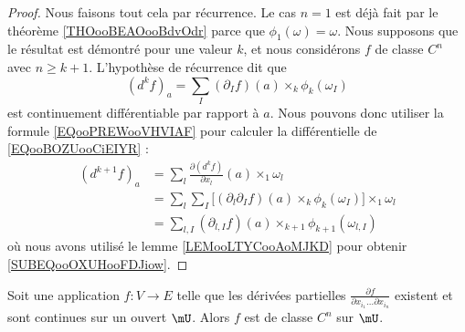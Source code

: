 \begin{proof}
	Nous faisons tout cela par récurrence. Le cas \( n=1\) est déjà fait par le théorème \ref{THOooBEAOooBdvOdr} parce que \( \phi_1(\omega)=\omega\). Nous supposons que le résultat est démontré pour une valeur \( k\), et nous considérons \( f\) de classe \( C^n\) avec \( n\geq k+1\). L'hypothèse de récurrence dit que
	\begin{equation}        \label{EQooBOZUooCiEIYR}
		(d^kf)_a=\sum_{I}(\partial_{I}f)(a)\times_k\phi_k(\omega_{I})
	\end{equation}
	est continuement différentiable par rapport à \( a\). Nous pouvons donc utiliser la formule \eqref{EQooPREWooVHVIAF} pour calculer la différentielle de \eqref{EQooBOZUooCiEIYR} :
	\begin{subequations}
		\begin{align}
			(d^{k+1}f)_a & =\sum_l\frac{ \partial (d^kf) }{ \partial x_l }(a)\times_1\omega_l                                     \\
			             & =\sum_l\sum_{I}\big[ (\partial_l\partial_{I}f)(a)\times_k\phi_k(\omega_{I}) \big]\times_1\omega_l      \\
			             & =\sum_{l,I}(\partial_{l,I}f)(a)\times_{k+1}\phi_{k+1}(\omega_{l,I})        \label{SUBEQooOXUHooFDJiow}
		\end{align}
	\end{subequations}
	où nous avons utilisé le lemme \ref{LEMooLTYCooAoMJKD} pour obtenir \eqref{SUBEQooOXUHooFDJiow}.
\end{proof}

\begin{proposition}     \label{PROPooKOBVooQhrAeJ}
	Soit une application \( f\colon V\to E\) telle que les dérivées partielles \( \frac{ \partial f }{ \partial x_{i_1}\ldots \partial x_{i_n} }\) existent et sont continues sur un ouvert \( \mU\). Alors \( f\) est de classe \( C^n\) sur \( \mU\).
\end{proposition}

